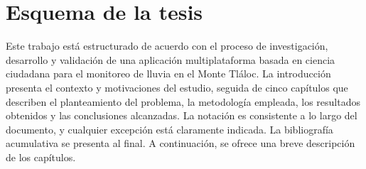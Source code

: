 \section{Esquema de la tesis}

Este trabajo está estructurado de acuerdo con el proceso de investigación, desarrollo y validación de una aplicación multiplataforma basada en ciencia ciudadana para el monitoreo de lluvia en el Monte Tláloc. La introducción presenta el contexto y motivaciones del estudio, seguida de cinco capítulos que describen el planteamiento del problema, la metodología empleada, los resultados obtenidos y las conclusiones alcanzadas. La notación es consistente a lo largo del documento, y cualquier excepción está claramente indicada. La bibliografía acumulativa se presenta al final. A continuación, se ofrece una breve descripción de los capítulos.

